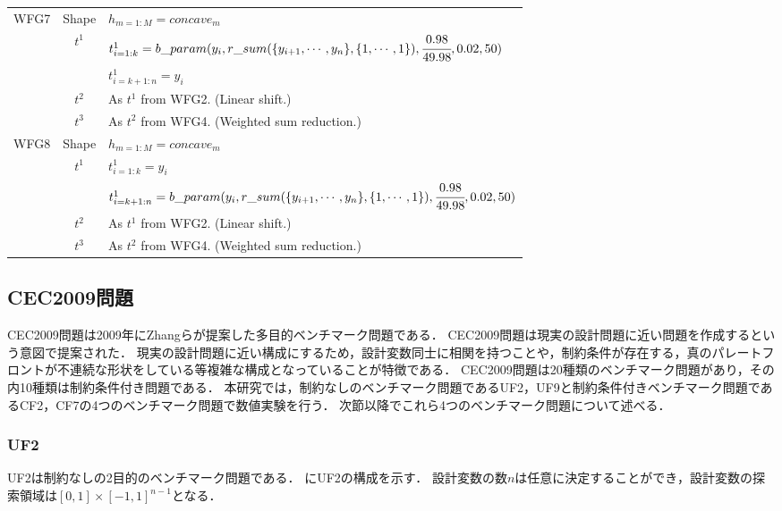 \documentclass[../main/main]{subfiles}
\begin{document}
\begin{table}[htbp]
\begin{tabular}{|c||c|l|}
\hline
WFG7 & Shape & $h_{m = 1:M} = concave_m$\\
           &     $ t^1$  & $t^1_{i = 1:k} = b\_param(y_i , r\_sum(\{ y_{i+1}, \cdots, y_n \}, \{1, \cdots, 1\}), \cfrac{0.98}{49.98},0.02,50)$\\
           &                 & $ t^1_{i = k+1:n} = y_i$\\
           &     $t^2$   & As $t^1$ from WFG2. (Linear shift.)\\
           &     $t^3$   & As $t^2$ from WFG4. (Weighted sum reduction.)\\
\hline  
WFG8 & Shape & $h_{m = 1:M} = concave_m$\\
           &     $ t^1$  & $t^1_{i = 1:k} = y_i$\\
           &                 & $t^1_{i = k+1:n} = b\_param(y_i , r\_sum(\{ y_{i+1}, \cdots, y_n \}, \{1, \cdots, 1\}), \cfrac{0.98}{49.98},0.02,50)$\\
           &     $t^2$   & As $t^1$ from WFG2. (Linear shift.)\\
           &     $t^3$   & As $t^2$ from WFG4. (Weighted sum reduction.)\\
\hline  
\end{tabular}
\end{table}

\clearpage

\subsection{CEC2009問題}
CEC2009問題\cite{}は2009年にZhangらが提案した多目的ベンチマーク問題である．
CEC2009問題は現実の設計問題に近い問題を作成するという意図で提案された．
現実の設計問題に近い構成にするため，設計変数同士に相関を持つことや，制約条件が存在する，真のパレートフロントが不連続な形状をしている等複雑な構成となっていることが特徴である．
CEC2009問題は20種類のベンチマーク問題があり，その内10種類は制約条件付き問題である．
本研究では，制約なしのベンチマーク問題であるUF2，UF9と制約条件付きベンチマーク問題であるCF2，CF7の4つのベンチマーク問題で数値実験を行う．
次節以降でこれら4つのベンチマーク問題について述べる．

\subsubsection{UF2}
UF2は制約なしの2目的のベンチマーク問題である．
にUF2の構成を示す．
設計変数の数$n$は任意に決定することができ，設計変数の探索領域は$[0,1] \times [-1,1]^{n-1}$となる．
\end{document}
